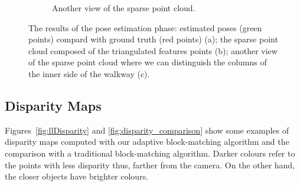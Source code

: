 \begin{figure}[h]
\begin{subfigure}{\linewidth}
\caption{Another view of the sparse point cloud.}
\label{fig:trajectory3}
\end{subfigure}
\caption{The results of the pose estimation phase: estimated poses (green
points) compard with ground truth (red points) (a); the sparse point cloud
composed of the triangulated features points (b); another view of the sparse
point cloud where we can distinguish the columns of the inner side of the
walkway (c).}
\label{fig:trajectory}
\end{figure}
%
\subsection{Disparity Maps}
Figures~\ref{fig:llDisparity} and \ref{fig:disparity_comparison}
show some examples of disparity maps computed
with our adaptive block-matching algorithm and the comparison with a
traditional block-matching algorithm. Darker colours refer to the points
with less disparity thus, farther from the camera. On the other hand, the closer
objects have brighter colours.
%
